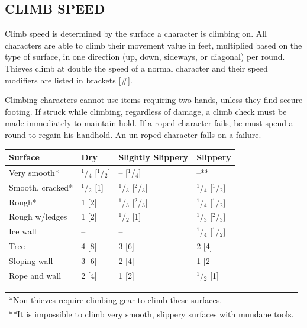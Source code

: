 \begin{multicols}{2}
\begin{minipage}{\columnwidth}
\end{minipage}

\subsection{CLIMB SPEED}

Climb speed is determined by the surface a character is climbing on.  All characters are able to climb their movement value in feet, multiplied based on the type of surface, in one direction (up, down, sideways, or diagonal) per round.  Thieves climb at double the speed of a normal character and their speed modifiers are listed in brackets [\#].

Climbing characters cannot use items requiring two hands, unless they find secure footing.  If struck while climbing, regardless of damage, a climb check must be made immediately to maintain hold.  If a roped character fails, he must spend a round to regain his handhold.  An un-roped character falls on a failure.

\noindent
\begin{minipage}{\columnwidth}

\label{climbinbspeedmods}
\noindent
\begin{tabular}{|p{}|p{}|p{}|p{}|}
\hline
Surface				& Dry					& Slightly Slippery		& Slippery \\
\hline\hline
\rowcolor[gray]{.9}Very smooth*		& $^1$/$_4$ [$^1$/$_2$]	& -- [$^1$/$_4$]		& --** \\
Smooth, cracked*	& $^1$/$_2$ [1]			& $^1$/$_3$ [$^2$/$_3$] & $^1$/$_4$ [$^1$/$_2$] \\
\rowcolor[gray]{.9}Rough*				& 1 [2]					& $^1$/$_3$ [$^2$/$_3$]	& $^1$/$_4$ [$^1$/$_2$] \\
Rough w/ledges		& 1 [2]					& $^1$/$_2$ [1]			& $^1$/$_3$ [$^2$/$_3$] \\
\rowcolor[gray]{.9}Ice wall			& --					& --					& $^1$/$_4$ [$^1$/$_2$] \\
Tree				& 4 [8]					& 3 [6]					& 2 [4] \\
\rowcolor[gray]{.9}Sloping wall		& 3 [6]					& 2 [4]					& 1 [2] \\
Rope and wall		& 2 [4]					& 1 [2]					& $^1$/$_2$ [1] \\
\hline
\end{tabular}
\noindent\begin{tabular}{p{}}
*Non-thieves require climbing gear to climb these surfaces. \\
**It is impossible to climb very smooth, slippery surfaces with mundane tools. \\
\end{tabular}\vspace{.5em}


\end{minipage}
\end{multicols}
